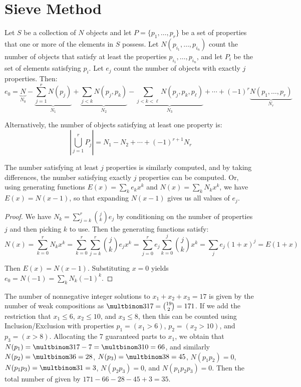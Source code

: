 \documentclass[a4paper]{article}
\begin{document}
\section{Sieve Method}
\begin{theorem}
Let $S$ be a collection of $N$ objects and let $P=\{p_1,\dots,p_r\}$ be a set of properties that one or more of the elements in $S$ possess. Let $N(p_{i_1},\dots,p_{i_n})$ count the number of objects that satisfy at least the properties $p_{i_1},\dots,p_{i_n}$, and let $P_i$ be the set of elements satisfying $p_i$. Let $e_j$ count the number of objects with exactly $j$ properties. Then:
\begin{equation*}
e_0
=\underbrace{N}_{N_0}-\underbrace{\sum_{j=1}^rN(p_j)}_{N_1}+\underbrace{\sum_{j<k}N(p_j,p_k)}_{N_2}-\underbrace{\sum_{j<k<\ell}N(p_j,p_k,p_\ell)}_{N_3}+\cdots+(-1)^r\underbrace{N(p_1,\dots,p_r)}_{N_r}
\end{equation*}

Alternatively, the number of objects satisfying at least one property is:
\begin{equation*}
\left|\bigcup_{j=1}^rP_j\right|
=N_1-N_2+\cdots+(-1)^{r+1}N_r
\end{equation*}

The number satisfying at least $j$ properties is similarly computed, and by taking differences, the number satisfying exactly $j$ properties can be computed. Or, using generating functions $E(x)=\sum_ke_kx^k$ and $N(x)=\sum_kN_kx^k$, we have $E(x)=N(x-1)$, so that expanding $N(x-1)$ gives us all values of $e_j$.
\begin{hl}
\begin{proof}
We have $N_k=\sum_{j=k}^r\binom jke_j$ by conditioning on the number of properties $j$ and then picking $k$ to use. Then the generating functions satisfy:
\begin{equation*}
N(x)
=\sum_{k=0}^rN_kx^k
=\sum_{k=0}^r\sum_{j=k}^r\binom jke_jx^k
=\sum_{j=0}^re_j\sum_{k=0}^j\binom jkx^k
=\sum_je_j(1+x)^j
=E(1+x)
\end{equation*}

Then $E(x)=N(x-1)$. Substituting $x=0$ yields $e_0=N(-1)=\sum_kN_k(-1)^k$.
\end{proof}
\end{hl}
\end{theorem}

\begin{example}
The number of nonnegative integer solutions to $x_1+x_2+x_3=17$ is given by the number of weak compositions as $\multbinom 3{17}=\binom{19}2=171$. If we add the restriction that $x_1\leq 6$, $x_2\leq10$, and $x_3\leq8$, then this can be counted using Inclusion/Exclusion with properties $p_1=(x_1>6)$, $p_2=(x_2>10)$, and $p_3=(x>8)$. Allocating the 7 guaranteed parts to $x_1$, we obtain that $N(p_1)=\multbinom 3{17-7}=\multbinom3{10}=66$, and similarly $N(p_2)=\multbinom3{6}=28$, $N(p_3)=\multbinom 38=45$, $N(p_1p_2)=0$, $N(p_1p_3)=\multbinom 31=3$, $N(p_2p_3)=0$, and $N(p_1p_2p_3)=0$. Then the total number of given by $171-66-28-45+3=35$.
\end{example}
\end{document}
